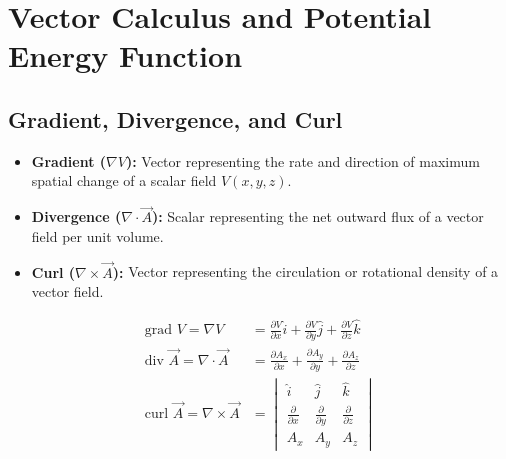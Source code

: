 \documentclass[12pt,a4paper]{article}
\begin{document}
\section{Vector Calculus and Potential Energy Function}

\subsection{Gradient, Divergence, and Curl}

\begin{tcolorbox}[defbox, title={\textbf{Definition: Gradient, Divergence, and Curl}}]
\begin{itemize}[leftmargin=*, itemsep=2pt]
  \item \textbf{Gradient ($\nabla V$):} Vector representing the rate and direction of maximum spatial change of a scalar field $V(x,y,z)$.
  \item \textbf{Divergence ($\nabla \cdot \vec{A}$):} Scalar representing the net outward flux of a vector field per unit volume.
  \item \textbf{Curl ($\nabla \times \vec{A}$):} Vector representing the circulation or rotational density of a vector field.
\end{itemize}
\end{tcolorbox}

\begin{tcolorbox}[formulabox, title={\textbf{Mathematical Definitions in Cartesian Coordinates}}]
\begin{align}
\text{grad } V = \nabla V &= \frac{\partial V}{\partial x}\hat{i} + \frac{\partial V}{\partial y}\hat{j} + \frac{\partial V}{\partial z}\hat{k} \\[4pt]
\text{div } \vec{A} = \nabla \cdot \vec{A} &= \frac{\partial A_x}{\partial x} + \frac{\partial A_y}{\partial y} + \frac{\partial A_z}{\partial z} \\[4pt]
\text{curl } \vec{A} = \nabla \times \vec{A} &= 
\begin{vmatrix}
\hat{i} & \hat{j} & \hat{k} \\
\frac{\partial}{\partial x} & \frac{\partial}{\partial y} & \frac{\partial}{\partial z} \\
A_x & A_y & A_z
\end{vmatrix}
\end{align}
\end{tcolorbox}
\end{document}
